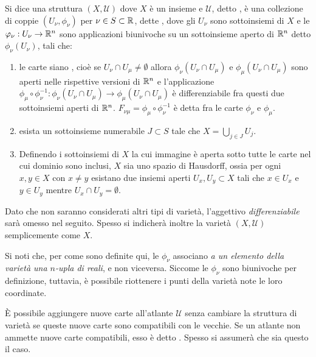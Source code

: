 \begin{definition}
  Si dice  una struttura $(X,\mathcal{U})$ dove $X$ è un insieme e $\mathcal{U}$, detto , è una collezione di coppie $(U_{\nu}, \phi_{\nu})$ per $\nu \in S \subset \mathbb{R}$, dette , dove gli $U_{\nu}$ sono sottoinsiemi di $X$ e le $\varphi_{\nu}:U_{\nu}\to \mathbb{R}^{n}$ sono applicazioni biunivoche su un sottoinsieme aperto di $\mathbb{R}^{n}$ detto $\phi_{\nu}(U_{\nu})$, tali che:
  \begin{enumerate}
    \item le carte siano , cioè se $U_{\nu} \cap U_{\mu} \neq \emptyset$ allora $\phi_{\nu}(U_{\nu} \cap U_{\mu})$ e $\phi_{\mu}(U_{\nu} \cap U_{\mu})$ sono aperti nelle rispettive versioni di $\mathbb{R}^{n}$ e l'applicazione $\phi_{\mu} \circ \phi_{\nu}^{-1}: \phi_{\nu}(U_{\nu} \cap U_{\mu}) \to \phi_{\mu}(U_{\nu} \cap U_{\mu})$ è differenziabile fra questi due sottoinsiemi aperti di $\mathbb{R}^{n}$. $F_{\nu\mu} = \phi_{\mu} \circ \phi_{\nu}^{-1}$ è detta  fra le carte $\phi_{\nu}$ e $\phi_{\mu}$.
    \item esista un sottoinsieme numerabile $J \subset S$ tale che $X = \bigcup_{j \in  J} U_j$.
    \item Definendo  i sottoinsiemi di $X$ la cui immagine è aperta sotto tutte le carte nel cui dominio sono inclusi, $X$ sia uno spazio di Hausdorff, ossia per ogni $x,y \in X$ con $x \neq y$ esistano due insiemi aperti $U_x, U_y \subset X$ tali che $x \in U_x$ e $y \in  U_y$ mentre $U_x \cap U_y = \emptyset$.
  \end{enumerate}
   Dato che non saranno considerati altri tipi di varietà, l'aggettivo \emph{differenziabile} sarà omesso nel seguito. Spesso si indicherà inoltre la varietà $(X,\mathcal{U})$ semplicemente come $X$.
\end{definition}
\begin{remark}
  Si noti che, per come sono definite qui, le $\phi_{\nu}$ associano \emph{a un elemento della varietà una $n$-upla di reali}, e non viceversa. Siccome le $\phi_{\nu}$ sono biunivoche per definizione, tuttavia, è possibile riottenere i punti della varietà note le loro coordinate.
\end{remark}
\begin{remark}
  È possibile aggiungere nuove carte all'atlante $\mathcal{U}$ senza cambiare la struttura di varietà se queste nuove carte sono compatibili con le vecchie. Se un atlante non ammette nuove carte compatibili, esso è detto . Spesso si assumerà che sia questo il caso.
\end{remark}
